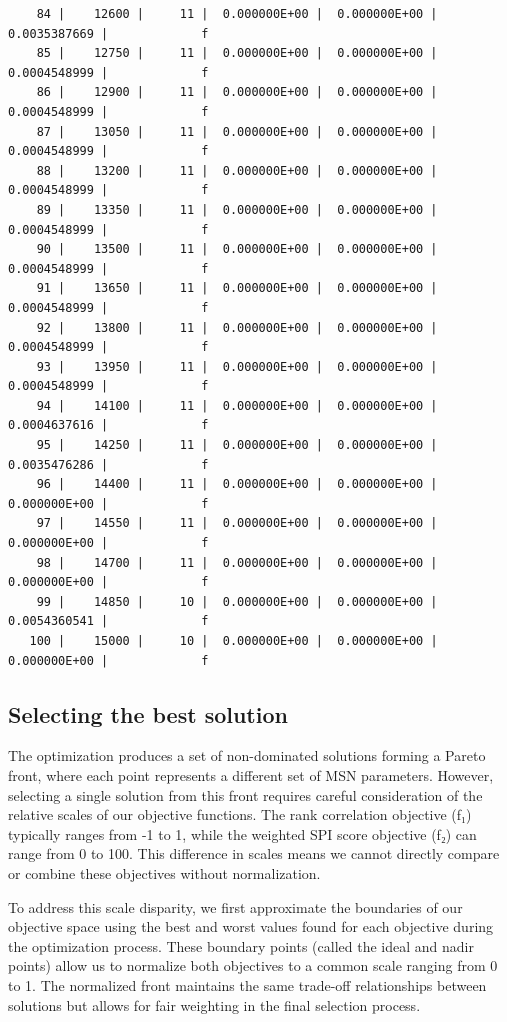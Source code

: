 \documentclass[
  authoryear,
  preprint,
  3p]{elsarticle}
\begin{document}
\begin{verbatim}
    84 |    12600 |     11 |  0.000000E+00 |  0.000000E+00 |  0.0035387669 |             f
    85 |    12750 |     11 |  0.000000E+00 |  0.000000E+00 |  0.0004548999 |             f
    86 |    12900 |     11 |  0.000000E+00 |  0.000000E+00 |  0.0004548999 |             f
    87 |    13050 |     11 |  0.000000E+00 |  0.000000E+00 |  0.0004548999 |             f
    88 |    13200 |     11 |  0.000000E+00 |  0.000000E+00 |  0.0004548999 |             f
    89 |    13350 |     11 |  0.000000E+00 |  0.000000E+00 |  0.0004548999 |             f
    90 |    13500 |     11 |  0.000000E+00 |  0.000000E+00 |  0.0004548999 |             f
    91 |    13650 |     11 |  0.000000E+00 |  0.000000E+00 |  0.0004548999 |             f
    92 |    13800 |     11 |  0.000000E+00 |  0.000000E+00 |  0.0004548999 |             f
    93 |    13950 |     11 |  0.000000E+00 |  0.000000E+00 |  0.0004548999 |             f
    94 |    14100 |     11 |  0.000000E+00 |  0.000000E+00 |  0.0004637616 |             f
    95 |    14250 |     11 |  0.000000E+00 |  0.000000E+00 |  0.0035476286 |             f
    96 |    14400 |     11 |  0.000000E+00 |  0.000000E+00 |  0.000000E+00 |             f
    97 |    14550 |     11 |  0.000000E+00 |  0.000000E+00 |  0.000000E+00 |             f
    98 |    14700 |     11 |  0.000000E+00 |  0.000000E+00 |  0.000000E+00 |             f
    99 |    14850 |     10 |  0.000000E+00 |  0.000000E+00 |  0.0054360541 |             f
   100 |    15000 |     10 |  0.000000E+00 |  0.000000E+00 |  0.000000E+00 |             f
\end{verbatim}

\subsection{Selecting the best
solution}\label{selecting-the-best-solution}

The optimization produces a set of non-dominated solutions forming a
Pareto front, where each point represents a different set of MSN
parameters. However, selecting a single solution from this front
requires careful consideration of the relative scales of our objective
functions. The rank correlation objective (f₁) typically ranges from -1
to 1, while the weighted SPI score objective (f₂) can range from 0 to
100. This difference in scales means we cannot directly compare or
combine these objectives without normalization.

To address this scale disparity, we first approximate the boundaries of
our objective space using the best and worst values found for each
objective during the optimization process. These boundary points (called
the ideal and nadir points) allow us to normalize both objectives to a
common scale ranging from 0 to 1. The normalized front maintains the
same trade-off relationships between solutions but allows for fair
weighting in the final selection process.
\end{document}

